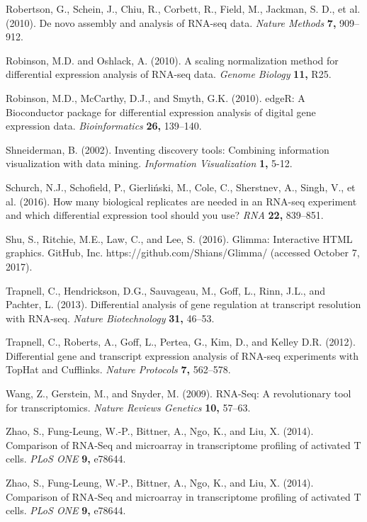 \documentclass[referee]{biom}
\begin{document}
\begin{thebibliography}{}
\bibitem{ } Robertson, G., Schein, J., Chiu, R., Corbett, R., Field, M., Jackman, S. D., et al. (2010). De novo assembly and analysis of RNA-seq data. \textit{Nature Methods} \textbf{7,} 909–912.

\bibitem{ } Robinson, M.D. and Oshlack, A. (2010). A scaling normalization method for differential expression analysis of RNA-seq data. \textit{Genome Biology} \textbf{11,} R25.

\bibitem{ } Robinson, M.D., McCarthy, D.J., and Smyth, G.K. (2010). edgeR: A Bioconductor package for differential expression analysis of digital gene expression data. \textit{Bioinformatics} \textbf{26,} 139–140.

\bibitem{ } Shneiderman, B. (2002). Inventing discovery tools: Combining information visualization with data mining. \textit{Information Visualization} \textbf{1,} 5-12.

\bibitem{ } Schurch, N.J., Schofield, P., Gierliński, M., Cole, C., Sherstnev, A., Singh, V., et al. (2016). How many biological replicates are needed in an RNA-seq experiment and which differential expression tool should you use? \textit{RNA} \textbf{22,} 839–851.

\bibitem{ } Shu, S., Ritchie, M.E., Law, C., and Lee, S. (2016). Glimma: Interactive HTML graphics. GitHub, Inc. https://github.com/Shians/Glimma/ (accessed October 7, 2017).

\bibitem{ } Trapnell, C., Hendrickson, D.G., Sauvageau, M., Goff, L., Rinn, J.L., and Pachter, L. (2013). Differential analysis of gene regulation at transcript resolution with RNA-seq. \textit{Nature Biotechnology} \textbf{31,} 46–53.

\bibitem{ } Trapnell, C., Roberts, A., Goff, L., Pertea, G., Kim, D., and Kelley D.R. (2012). Differential gene and transcript expression analysis of RNA-seq experiments with TopHat and Cufflinks. \textit{Nature Protocols} \textbf{7,} 562–578.

\bibitem{ } Wang, Z., Gerstein, M., and Snyder, M. (2009). RNA-Seq: A revolutionary tool for transcriptomics. \textit{Nature Reviews Genetics} \textbf{10,} 57–63.

\bibitem{ } Zhao, S., Fung-Leung, W.-P., Bittner, A., Ngo, K., and Liu, X. (2014). Comparison of RNA-Seq and microarray in transcriptome profiling of activated T cells. \textit{PLoS ONE} \textbf{9,} e78644.

\bibitem{ } Zhao, S., Fung-Leung, W.-P., Bittner, A., Ngo, K., and Liu, X. (2014). Comparison of RNA-Seq and microarray in transcriptome profiling of activated T cells. \textit{PLoS ONE} \textbf{9,} e78644.



\end{thebibliography}


\label{lastpage}
\end{document}

